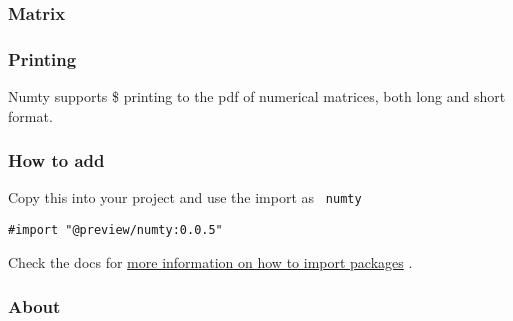 \subsubsection{Matrix}\label{matrix}

\begin{Shaded}
\begin{Highlighting}[]
\end{Highlighting}
\end{Shaded}

\subsubsection{Printing}\label{printing}

Numty supports \$ printing to the pdf of numerical matrices, both long
and short format.

\begin{Shaded}
\begin{Highlighting}[]
\end{Highlighting}
\end{Shaded}

\subsubsection{How to add}\label{how-to-add}

Copy this into your project and use the import as \texttt{\ numty\ }

\begin{verbatim}
#import "@preview/numty:0.0.5"
\end{verbatim}



Check the docs for
\href{https://typst.app/docs/reference/scripting/\#packages}{more
information on how to import packages} .

\subsubsection{About}\label{about}

